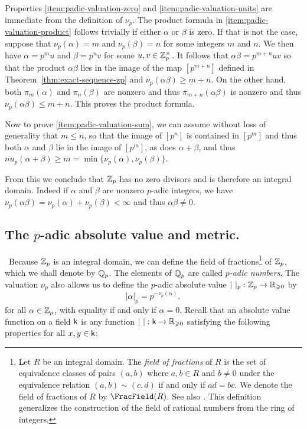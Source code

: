 \smallskip

Properties \ref{item:padic-valuation-zero} and \ref{item:padic-valuation-units} are immediate from the definition of \(\nu_p\). The product formula in \ref{item:padic-valuation-product} follows trivially if either \(\alpha\) or \(\beta\) is zero. If that is not the case, suppose that \(\nu_p(\alpha) = m\) and \(\nu_p(\beta) = n\) for some integers \(m\) and \(n\). We then have \(\alpha = p^mu\) and \(\beta = p^nv\) for some \(u, v \in \mathbb{Z}_p^{\times}\). It follows that \(\alpha\beta = p^{m + n}uv\) so that the product \(\alpha\beta\) lies in the image of the map \([p^{m+n}]\) defined in Theorem~\ref{thm:exact-sequence-zp} and \(\nu_p(\alpha\beta) \geq m + n\). On the other hand, both \(\pi_m(\alpha)\) and \(\pi_n(\beta)\) are nonzero and thus \(\pi_{m+n}(\alpha\beta)\) is nonzero and thus \(\nu_p(\alpha\beta) \leq m + n\). This proves the product formula.

Now to prove \ref{item:padic-valuation-sum}, we can assume without loss of generality that \(m \leq n\), so that the image of \([p^n]\) is contained in \([p^m]\) and thus both \(\alpha\) and \(\beta\) lie in the image of \([p^m]\), as does \(\alpha + \beta\), and thus \(nu_p(\alpha + \beta) \geq m = \min\{\nu_p(\alpha), \nu_p(\beta)\}\).

From this we conclude that \(\mathbb{Z}_p\) has no zero divisors and is therefore an integral domain. Indeed if \(\alpha\) and \(\beta\) are nonzero \(p\)-adic integers, we have \(\nu_p(\alpha\beta) = \nu_p(\alpha) + \nu_p(\beta) < \infty\) and thus \(\alpha\beta \neq 0\).

\subsection{The \(p\)-adic absolute value and metric.}\label{sec:padic-absolute-value}~Because \(\mathbb{Z}_p\) is an integral domain, we can define the field of fractions\footnote{
    Let \(R\) be an integral domain. The \emph{field of fractions} of \(R\) is the set of equivalence classes of pairs \((a, b)\) where \(a, b \in R\) and \(b \neq 0\) under the equivalence relation \((a, b) \sim (c, d)\) if and only if \(ad = bc\). We denote the field of fractions of \(R\) by \(\FracField(R)\). See also \cite[p.~142]{hungerford2012algebra}. This definition generalizes the construction of the field of rational numbers from the ring of integers.
} of \(\mathbb{Z}_p\), which we shall denote by \(\mathbb{Q}_p\). The elements of \(\mathbb{Q}_p\) are called \emph{\(p\)-adic numbers}. The valuation \(\nu_p\) also allows us to define the \(p\)-adic absolute value \(|\ |_p : \mathbb{Z}_p \to \mathbb{R}_{\geqslant 0}\) by
\[
  |\alpha|_p = p^{-\nu_p(\alpha)},
\]
for all \(\alpha \in \mathbb{Z}_p\), with equality if and only if \(\alpha = 0\). Recall that an absolute value function on a field \(\mathsf{k}\) is any function \(|\ | : \mathsf{k} \to \mathbb{R}_{\geqslant 0}\) satisfying the following properties for all \(x, y \in \mathsf{k}\):


